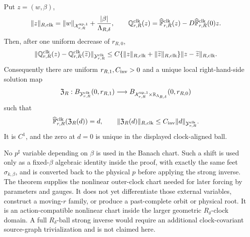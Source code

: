 \begin{theorem}
Put \(z=(w,\beta)\),
\begin{equation}
 \|z\|_{R,\rm clk}
 =\|w\|_{\mathcal X_{r,R}^{\rm up,1}}
       +\frac{|\beta|}{\Lambda_{R,\delta}},\qquad
 \mathbb Q_{r,R}^{\rm clk}(z)
 =\widehat{\mathbb F}_{r,R}^{\rm clk}(z)
  -D\widehat{\mathbb F}_{r,R}^{\rm clk}(0)z .  \label{eq:outer-clock-nonlinear-remainder}
\end{equation}
Then, after one uniform decrease of \(r_{R,0}\),
\begin{equation}
 \|\mathbb Q_{r,R}^{\rm clk}(z)
       -\mathbb Q_{r,R}^{\rm clk}(\widetilde z)\|_{
          \mathcal Y_{r,R}^{\rm clk}}
 \le C\{\|z\|_{R,\rm clk}+\|\widetilde z\|_{R,\rm clk}\}
       \|z-\widetilde z\|_{R,\rm clk}.          \label{eq:outer-clock-nonlinear-two-point}
\end{equation}
Consequently there are uniform \(r_{R,1},C_{\rm inv}>0\) and a unique local
right-hand-side solution map
\begin{equation}
 \mathfrak Z_R:
 B_{\mathcal Y_{r,R}^{\rm clk}}(0,r_{R,1})
 \longrightarrow
 B_{\mathcal X_{r,R}^{\rm up,1}
       \times\mathbb R_{\Lambda_{R,\delta}}}
       (0,r_{R,0})                               \label{eq:outer-clock-local-solution-map}
\end{equation}
such that
\begin{equation}
 \widehat{\mathbb F}_{r,R}^{\rm clk}
       (\mathfrak Z_R(d))=d,\qquad
 \|\mathfrak Z_R(d)\|_{R,\rm clk}
       \le C_{\rm inv}\|d\|_{\mathcal Y_{r,R}^{\rm clk}}. \label{eq:outer-clock-local-solution-bound}
\end{equation}
It is \(C^1\), and the zero at \(d=0\) is unique in the displayed
clock-aligned ball.

No \(p^\sharp\) variable depending on \(\beta\) is used in the Banach
chart.  Such a shift is used only as a fixed-\(\beta\) algebraic identity
inside the proof, with exactly the same feet \(\sigma_{k,\beta}\), and is
converted back to the physical \(p\) before applying the strong inverse.
The theorem supplies the nonlinear outer-clock chart needed for later
forcing by parameters and gauges.  It does not yet differentiate those
external variables, construct a moving-\(r\) family, or produce a
past-complete orbit or physical root.
It is an action-compatible nonlinear chart inside the larger geometric
\(R_\delta\)-clock domain.  A full \(R_\delta\)-ball strong inverse would
require an additional clock-covariant source-graph trivialization and is
not claimed here.
\end{theorem}


